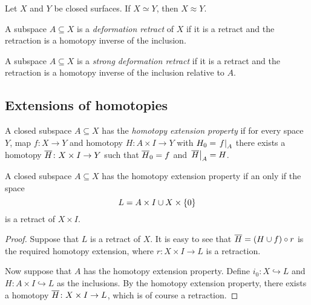 \begin{izrek}
Let $X$ and $Y$ be closed surfaces. If $X \simeq Y$, then
$X \approx Y$.
\end{izrek}

\begin{definicija}
A subspace $A \subseteq X$ is a
\emph{deformation retract} of $X$ if it
is a retract and the retraction is a homotopy inverse of the
inclusion.
\end{definicija}

\begin{definicija}
A subspace $A \subseteq X$ is a
\emph{strong deformation retract}
if it is a retract and the retraction is a homotopy inverse of the
inclusion relative to $A$.
\end{definicija}

\newpage

\subsection{Extensions of homotopies}


\begin{definicija}
A closed subspace $A \subseteq X$ has the
\emph{homotopy extension property}
if for every space $Y$, map $f \colon X \to Y$ and homotopy
$H \colon A \times I \to Y$ with $H_0 = \left. f\right|_{A}^{}$ there exists
a homotopy $\overline{H} \colon X \times I \to Y$ such that
$\overline{H}_0 = f$ and $\left. \overline{H}\right|_{A}^{} = H$.
\end{definicija}

\begin{trditev}
A closed subspace $A \subseteq X$ has the homotopy extension
property if an only if the space
\[
L = A \times I \cup X \times \left\{0\right\}
\]
is a retract of $X \times I$.
\end{trditev}

\begin{proof}
Suppose that $L$ is a retract of $X$. It is easy to see that
$\overline{H} = (H \cup f) \circ r$ is the required homotopy
extension, where $r \colon X \times I \to L$ is a retraction.

Now suppose that $A$ has the homotopy extension property. Define
$i_0 \colon X \hookrightarrow L$ and
$H \colon A \times I \hookrightarrow L$ as the inclusions. By the
homotopy extension property, there exists a homotopy
$\overline{H} \colon X \times I \to L$, which is of course a
retraction.
\end{proof}

